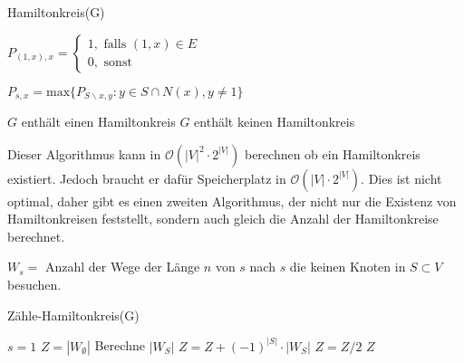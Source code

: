 \begin{algorithm}
    \caption{Hamiltonkreis(G)}
    \begin{algorithmic}[1]
         
            \State $P_{(1,x), x} =
            \begin{cases}
                1, \text{ falls }(1,x) \in E\\
                0, \text{ sonst }
            \end{cases} $
        \EndFor

         
                    \State $P_{s,x} = \text{max} \{ P_{S \backslash {x}, y}: y \in S \cap N(x), y \neq 1 \} $
                \EndFor
            \EndFor
        \EndFor

         
            \State \Return $G$ enthält einen Hamiltonkreis
        \Else
            \State \Return $G$ enthält keinen Hamiltonkreis
        \EndIf
    \end{algorithmic}
\end{algorithm}

Dieser Algorithmus kann in $\mathcal{O}(|V|^2 \cdot 2^{|V|})$ berechnen ob ein Hamiltonkreis existiert. Jedoch braucht
er dafür Speicherplatz in $\mathcal{O}(|V| \cdot 2^{|V|})$. Dies ist nicht optimal, daher gibt es einen zweiten Algorithmus,
der nicht nur die Existenz von Hamiltonkreisen feststellt, sondern auch gleich die Anzahl der Hamiltonkreise berechnet.

\begin{definition}
    $W_s = $ Anzahl der Wege der Länge $n$ von $s$ nach $s$ die keinen Knoten in $S \subset V$ besuchen. 
\end{definition}

\begin{algorithm}
    \caption{Zähle-Hamiltonkreis(G)}
    \begin{algorithmic}[1]
        \State $s = 1$ 
        \State $Z = |W_\emptyset|$
        \For{}
            \State Berechne $|W_S|$ 
            \State $Z = Z + (-1)^{|S|} \cdot |W_S|$
        \EndFor
        \State $Z = Z / 2$
        \State \Return $Z$ 
    \end{algorithmic}
\end{algorithm}

